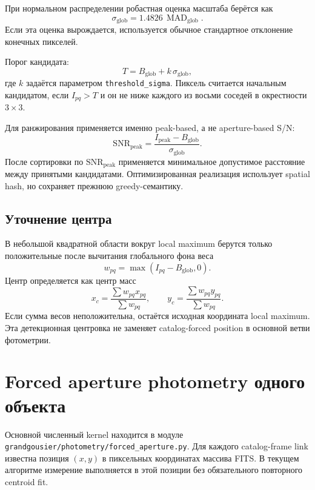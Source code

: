 При нормальном распределении робастная оценка масштаба берётся как
\begin{equation}
  \sigma_{\mathrm{glob}} = 1.4826\,\operatorname{MAD}_{\mathrm{glob}}.
\end{equation}
Если эта оценка вырождается, используется обычное стандартное отклонение конечных пикселей.

Порог кандидата:
\begin{equation}
  T = B_{\mathrm{glob}} + k\,\sigma_{\mathrm{glob}},
\end{equation}
где $k$ задаётся параметром \texttt{threshold\_sigma}. Пиксель считается начальным кандидатом, если $I_{pq}>T$ и он не ниже каждого из восьми соседей в окрестности $3\times3$.

Для ранжирования применяется именно peak-based, а не aperture-based S/N:
\begin{equation}
  \mathrm{SNR}_{\mathrm{peak}} =
  \frac{I_{\mathrm{peak}}-B_{\mathrm{glob}}}{\sigma_{\mathrm{glob}}}.
\end{equation}
После сортировки по $\mathrm{SNR}_{\mathrm{peak}}$ применяется минимальное допустимое расстояние между принятыми кандидатами. Оптимизированная реализация использует spatial hash, но сохраняет прежнюю greedy-семантику.

\subsection{Уточнение центра}

В небольшой квадратной области вокруг local maximum берутся только положительные после вычитания глобального фона веса
\begin{equation}
  w_{pq}=\max(I_{pq}-B_{\mathrm{glob}},0).
\end{equation}
Центр определяется как центр масс
\begin{equation}
  x_c=\frac{\sum w_{pq}x_{pq}}{\sum w_{pq}},
  \qquad
  y_c=\frac{\sum w_{pq}y_{pq}}{\sum w_{pq}}.
\end{equation}
Если сумма весов неположительна, остаётся исходная координата local maximum. Эта детекционная центровка не заменяет catalog-forced position в основной ветви фотометрии.

\section{Forced aperture photometry одного объекта}
\label{sec:forced-aperture-math}

Основной численный kernel находится в модуле
\texttt{grandgousier/photometry/forced\_aperture.py}. Для каждого catalog-frame link известна позиция $(x,y)$ в пиксельных координатах массива FITS. В текущем алгоритме измерение выполняется в этой позиции без обязательного повторного centroid fit.

